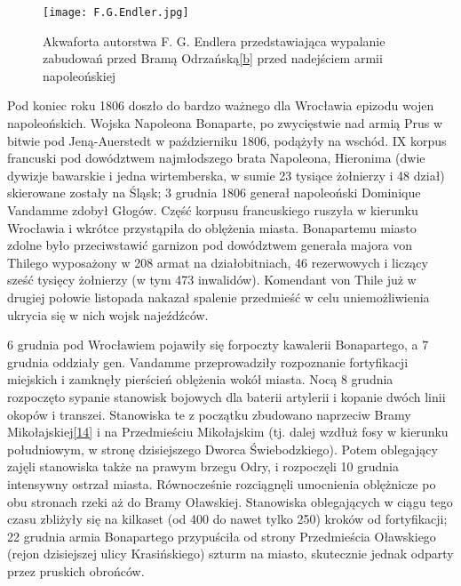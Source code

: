 \documentclass{article}
\begin{document}
\begin{wrapfigure}{r}{0.42\textwidth} 
\begin{center}
\vspace{-20pt}
\texttt{[image: F.G.Endler.jpg]}
\end{center}
\vspace{-20pt}
\caption{Akwaforta autorstwa F. G. Endlera przedstawiająca wypalanie zabudowań przed Bramą Odrzańską\hyperref[b]{[b]} przed nadejściem armii napoleońskiej}
\vspace{-10pt}
\end{wrapfigure}

Pod koniec roku 1806 doszło do bardzo ważnego dla Wrocławia epizodu wojen napoleońskich. Wojska Napoleona Bonaparte, po zwycięstwie nad armią Prus w bitwie pod Jeną-Auerstedt w październiku 1806, podążyły na wschód. IX korpus francuski pod dowództwem najmłodszego brata Napoleona, Hieronima (dwie dywizje bawarskie i jedna wirtemberska, w sumie 23 tysiące żołnierzy i 48 dział) skierowane zostały na Śląsk; 3 grudnia 1806 generał napoleoński Dominique Vandamme zdobył Głogów. Część korpusu francuskiego ruszyła w kierunku Wrocławia i wkrótce przystąpiła do oblężenia miasta. Bonapartemu miasto zdolne było przeciwstawić garnizon pod dowództwem generała majora von Thilego wyposażony w 208 armat na działobitniach, 46 rezerwowych i liczący sześć tysięcy żołnierzy (w tym 473 inwalidów). Komendant von Thile już w drugiej połowie listopada nakazał spalenie przedmieść w celu uniemożliwienia ukrycia się w nich wojsk najeźdźców.

6 grudnia pod Wrocławiem pojawiły się forpoczty kawalerii Bonapartego, a 7 grudnia oddziały gen. Vandamme przeprowadziły rozpoznanie fortyfikacji miejskich i zamknęły pierścień oblężenia wokół miasta. Nocą 8 grudnia rozpoczęto sypanie stanowisk bojowych dla baterii artylerii i kopanie dwóch linii okopów i transzei. Stanowiska te z początku zbudowano naprzeciw Bramy Mikołajskiej\hyperref[14]{[14]} i na Przedmieściu Mikołajskim (tj. dalej wzdłuż fosy w kierunku południowym, w stronę dzisiejszego Dworca Świebodzkiego). Potem oblegający zajęli stanowiska także na prawym brzegu Odry, i rozpoczęli 10 grudnia intensywny ostrzał miasta. Równocześnie rozciągnęli umocnienia oblężnicze po obu stronach rzeki aż do Bramy Oławskiej. Stanowiska oblegających w ciągu tego czasu zbliżyły się na kilkaset (od 400 do nawet tylko 250) kroków od fortyfikacji; 22 grudnia armia Bonapartego przypuściła od strony Przedmieścia Oławskiego (rejon dzisiejszej ulicy Krasińskiego) szturm na miasto, skutecznie jednak odparty przez pruskich obrońców.
\end{document}
